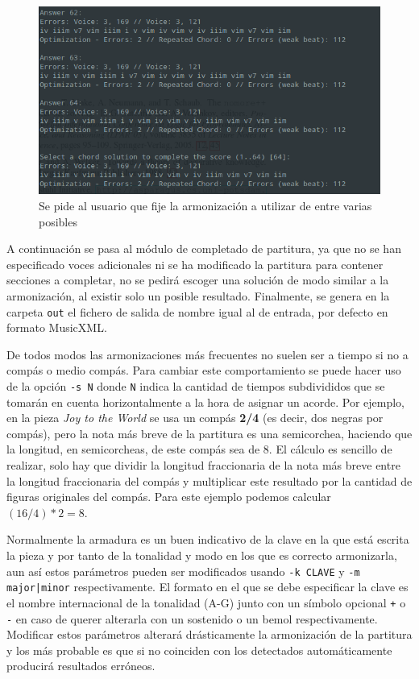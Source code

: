 \begin{figure}
	\centering
	\includegraphics[width=0.8\linewidth]{imagenes/usage/harmony_select.png}
	\caption{Se pide al usuario que fije la armonización a utilizar de entre varias posibles}
	\label{fig:usage_harmony_select}
\end{figure}

A continuación se pasa al módulo de completado de partitura, ya que no se han especificado voces adicionales ni se ha modificado la partitura para contener secciones a completar, no se pedirá escoger una solución de modo similar a la armonización, al existir solo un posible resultado. Finalmente, se genera en la carpeta \texttt{out} el fichero de salida de nombre igual al de entrada, por defecto en formato MusicXML.

De todos modos las armonizaciones más frecuentes no suelen ser a tiempo si no a compás o medio compás. Para cambiar este comportamiento se puede hacer uso de la opción \texttt{-s N} donde \texttt{N} indica la cantidad de tiempos subdivididos que se tomarán en cuenta horizontalmente a la hora de asignar un acorde. Por ejemplo, en la pieza \textit{Joy to the World} se usa un compás \textbf{2/4} (es decir, dos negras por compás), pero la nota más breve de la partitura es una semicorchea, haciendo que la longitud, en semicorcheas, de este compás sea de 8. El cálculo es sencillo de realizar, solo hay que dividir la longitud fraccionaria de la nota más breve entre la longitud fraccionaria del compás y multiplicar este resultado por la cantidad de figuras originales del compás. Para este ejemplo podemos calcular $(16/4)*2=8$.

Normalmente la armadura es un buen indicativo de la clave en la que está escrita la pieza y por tanto de la tonalidad y modo en los que es correcto armonizarla, aun así estos parámetros pueden ser modificados usando \texttt{-k CLAVE} y \texttt{-m major|minor} respectivamente. 
El formato en el que se debe especificar la clave es el nombre internacional de la tonalidad (A-G) junto con un símbolo opcional \texttt{+} o \texttt{-} en caso de querer alterarla con un sostenido o un bemol respectivamente. Modificar estos parámetros alterará drásticamente la armonización de la partitura y los más probable es que si no coinciden con los detectados automáticamente producirá resultados erróneos.

